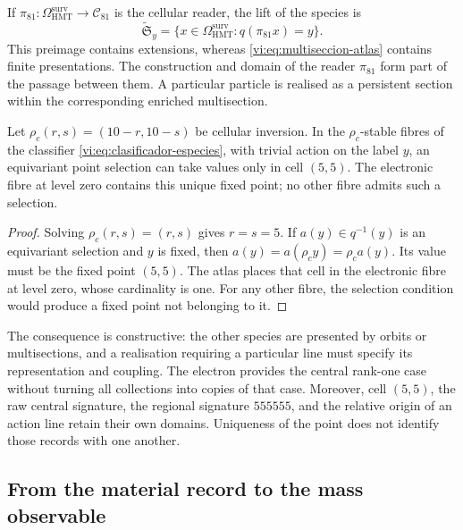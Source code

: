 If $\pi_{81}:\Omega^{\mathrm{surv}}_{\mathrm{HMT}}\to
\mathcal C_{81}$ is the cellular reader, the lift of the species is
\begin{equation}
 \widetilde{\mathfrak S}_y
 =\{x\in\Omega^{\mathrm{surv}}_{\mathrm{HMT}}:
                  q(\pi_{81}x)=y\}.
 \label{vi:eq:multiseccion-enriquecida}
\end{equation}
This preimage contains extensions, whereas
\eqref{vi:eq:multiseccion-atlas} contains finite presentations. The
construction and domain of the reader $\pi_{81}$ form part of the passage
between them. A particular particle is realised as a persistent section
within the corresponding enriched multisection.

\begin{theorem}
\label{vi:thm:selector-central}
Let $\rho_c(r,s)=(10-r,10-s)$ be cellular inversion. In the
$\rho_c$-stable fibres of the classifier \eqref{vi:eq:clasificador-especies},
with trivial action on the label $y$, an equivariant point
selection can take values only in cell $(5,5)$. The electronic fibre
at level zero contains this unique fixed point; no other
fibre admits such a selection.
\end{theorem}
\begin{proof}
Solving $\rho_c(r,s)=(r,s)$ gives $r=s=5$. If $a(y)\in q^{-1}(y)$
is an equivariant selection and $y$ is fixed, then
$a(y)=a(\rho_c y)=\rho_c a(y)$. Its value must be the fixed point
$(5,5)$. The atlas places that cell in the electronic fibre at level
zero, whose cardinality is one. For any other fibre, the selection
condition would produce a fixed point not belonging to it.
\end{proof}

The consequence is constructive: the other species are presented by
orbits or multisections, and a realisation requiring a particular
line must specify its representation and coupling. The
electron provides the central rank-one case without turning all
collections into copies of that case. Moreover, cell $(5,5)$, the raw central
signature, the regional signature $555555$, and the relative origin of an
action line retain their own domains. Uniqueness of the point
does not identify those records with one another.

\subsection{From the material record to the mass observable}
\label{vi:subsec:particula-observable}

